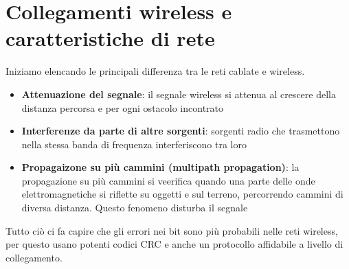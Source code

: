 \documentclass[11pt,a4paper]{book}
\begin{document}
\section{Collegamenti wireless e caratteristiche di rete}
Iniziamo elencando le principali differenza tra le reti cablate e wireless.
\begin{itemize}
	\item \textbf{Attenuazione del segnale}: il segnale wireless si attenua al crescere della distanza percorsa e per ogni ostacolo incontrato
	\item \textbf{Interferenze da parte di altre sorgenti}: sorgenti radio che trasmettono nella stessa banda di frequenza interferiscono tra loro
	\item \textbf{Propagaizone su più cammini (multipath propagation)}: la propagazione su più cammini si veerifica quando una parte delle onde elettromagnetiche si riflette su oggetti e sul terreno, percorrendo cammini di diversa distanza. Questo fenomeno disturba il segnale
\end{itemize}

Tutto ciò ci fa capire che gli errori nei bit sono più probabili nelle reti wireless, per questo usano potenti codici CRC e anche un protocollo affidabile a livello di collegamento.
\end{document}
